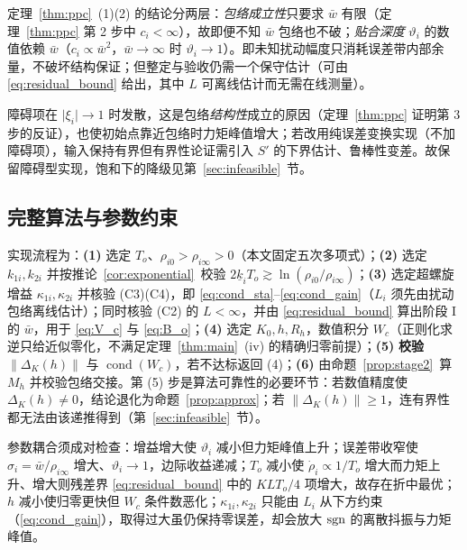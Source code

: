 \begin{remark}\label{rem:unknown_w}
定理~\ref{thm:ppc}~(1)(2) 的结论分两层：\emph{包络成立性}只要求 \(\bar w\) 有限（定理~\ref{thm:ppc} 第 2 步中 \(c_i<\infty\)），故即便不知 \(\bar w\) 包络也不破；\emph{贴合深度} \(\vartheta_i\) 的数值依赖 \(\bar w\)（\(c_i\propto\bar w^2\)，\(\bar w\to\infty\) 时 \(\vartheta_i\to1\)）。即未知扰动幅度只消耗误差带内部余量，不破坏结构保证；但整定与验收仍需一个保守估计（可由 \eqref{eq:residual_bound} 给出，其中 \(L\) 可离线估计而无需在线测量）。
\end{remark}

\begin{remark}[障碍增益与饱和]\label{rem:barrier}
障碍项在 \(\lvert\xi_i\rvert\to1\) 时发散，这是包络\emph{结构性}成立的原因（定理~\ref{thm:ppc} 证明第 3 步的反证），也使初始点靠近包络时力矩峰值增大；若改用纯误差变换实现（不加障碍项），输入保持有界但有界性论证需引入 \(S'\) 的下界估计、鲁棒性变差。故保留障碍型实现，饱和下的降级见第~\ref{sec:infeasible}~节。
\end{remark}

\subsection{完整算法与参数约束}
\label{sec:algorithm}

实现流程为：\textbf{(1)} 选定 \(T_o\)、\(\rho_{i0}>\rho_{i\infty}>0\)（本文固定五次多项式）；\textbf{(2)} 选定 \(k_{1i},k_{2i}\) 并按推论~\ref{cor:exponential}~校验 \(2\underline k_iT_o\gtrsim\ln(\rho_{i0}/\rho_{i\infty})\)；\textbf{(3)} 选定超螺旋增益 \(\kappa_{1i},\kappa_{2i}\) 并核验 \textup{(C3)(C4)}，即 \eqref{eq:cond_sta}--\eqref{eq:cond_gain}（\(L_i\) 须先由扰动包络离线估计）；同时核验 \textup{(C2)} 的 \(L<\infty\)，并由 \eqref{eq:residual_bound} 算出阶段 I 的 \(\bar w\)，用于 \eqref{eq:V_c} 与 \eqref{eq:B_o}；\textbf{(4)} 选定 \(K_0,h,R_h\)，数值积分 \(W_c\)（正则化求逆只给近似零化，不满足定理~\ref{thm:main}~(iv) 的精确归零前提）；\textbf{(5)} \textbf{校验} \(\lVert\Delta_K(h)\rVert\) 与 \(\operatorname{cond}(W_c)\)，若不达标返回 (4)；\textbf{(6)} 由命题~\ref{prop:stage2}~算 \(M_h\) 并校验包络交接。第 (5) 步是算法可靠性的必要环节：若数值精度使 \(\Delta_K(h)\neq0\)，结论退化为命题~\ref{prop:approx}；若 \(\lVert\Delta_K(h)\rVert\ge1\)，连有界性都无法由该递推得到（第~\ref{sec:infeasible}~节）。

参数耦合须成对检查：增益增大使 \(\vartheta_i\) 减小但力矩峰值上升；误差带收窄使 \(\sigma_i=\bar w/\rho_{i\infty}\) 增大、\(\vartheta_i\to1\)，边际收益递减；\(T_o\) 减小使 \(\dot\rho_i\propto1/T_o\) 增大而力矩上升、增大则残差界 \eqref{eq:residual_bound} 中的 \(KLT_o/4\) 项增大，故存在折中最优；\(h\) 减小使归零更快但 \(W_c\) 条件数恶化；\(\kappa_{1i},\kappa_{2i}\) 只能由 \(L_i\) 从下方约束（\eqref{eq:cond_gain}），取得过大虽仍保持零误差，却会放大 \(\operatorname{sgn}\) 的离散抖振与力矩峰值。
